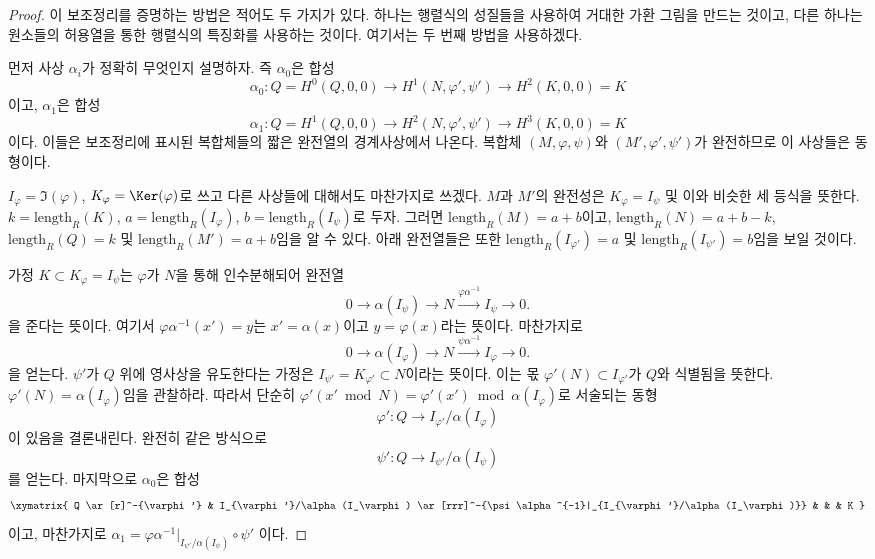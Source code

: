 \begin{proof}
이 보조정리를 증명하는 방법은 적어도 두 가지가 있다. 하나는 행렬식의
성질들을 사용하여 거대한 가환 그림을 만드는 것이고, 다른 하나는
원소들의 허용열을 통한 행렬식의 특징화를 사용하는 것이다. 여기서는
두 번째 방법을 사용하겠다.

\medskip\noindent
먼저 사상 $\alpha_i$가 정확히 무엇인지 설명하자. 즉 $\alpha_0$은
합성
$$
\alpha_0 : Q = H^0(Q, 0, 0) \to H^1(N, \varphi', \psi') \to H^2(K, 0, 0) = K
$$
이고, $\alpha_1$은 합성
$$
\alpha_1 : Q = H^1(Q, 0, 0) \to H^2(N, \varphi', \psi') \to H^3(K, 0, 0) = K
$$
이다. 이들은 보조정리에 표시된 복합체들의 짧은 완전열의 경계사상에서
나온다. 복합체 $(M, \varphi, \psi)$와 $(M', \varphi', \psi')$가
완전하므로 이 사상들은 동형이다.

\medskip\noindent
$I_\varphi = \Im(\varphi)$, $K_\varphi = \Ker(\varphi)$로 쓰고 다른
사상들에 대해서도 마찬가지로 쓰겠다. $M$과 $M'$의 완전성은
$K_\varphi = I_\psi$ 및 이와 비슷한 세 등식을 뜻한다.
$k = \text{length}_R(K)$, $a = \text{length}_R(I_\varphi)$,
$b = \text{length}_R(I_\psi)$로 두자. 그러면
$\text{length}_R(M) = a + b$이고,
$\text{length}_R(N) = a + b - k$, $\text{length}_R(Q) = k$ 및
$\text{length}_R(M') = a + b$임을 알 수 있다. 아래 완전열들은 또한
$\text{length}_R(I_{\varphi'}) = a$ 및
$\text{length}_R(I_{\psi'}) = b$임을 보일 것이다.

\medskip\noindent
가정 $K \subset K_\varphi = I_\psi$는 $\varphi$가 $N$을 통해
인수분해되어 완전열
$$
0 \to \alpha(I_\psi) \to N \xrightarrow{\varphi\alpha^{-1}} I_\psi \to 0.
$$
을 준다는 뜻이다. 여기서 $\varphi\alpha^{-1}(x') = y$는
$x' = \alpha(x)$이고 $y = \varphi(x)$라는 뜻이다. 마찬가지로
$$
0 \to \alpha(I_\varphi) \to N \xrightarrow{\psi\alpha^{-1}} I_\varphi \to 0.
$$
을 얻는다. $\psi'$가 $Q$ 위에 영사상을 유도한다는 가정은
$I_{\psi'} = K_{\varphi'} \subset N$이라는 뜻이다. 이는 몫
$\varphi'(N) \subset I_{\varphi'}$가 $Q$와 식별됨을 뜻한다.
$\varphi'(N) = \alpha(I_\varphi)$임을 관찰하라. 따라서 단순히
$\varphi'(x' \bmod N) = \varphi'(x') \bmod \alpha(I_\varphi)$로
서술되는 동형
$$
\varphi' : Q \to I_{\varphi'}/\alpha(I_\varphi)
$$
이 있음을 결론내린다. 완전히 같은 방식으로
$$
\psi' : Q \to I_{\psi'}/\alpha(I_\psi)
$$
를 얻는다. 마지막으로 $\alpha_0$은 합성
$$
\xymatrix{
Q \ar[r]^-{\varphi'} &
I_{\varphi'}/\alpha(I_\varphi)
\ar[rrr]^-{\psi\alpha^{-1}|_{I_{\varphi'}/\alpha(I_\varphi)}} & & &
K
}
$$
이고, 마찬가지로
$\alpha_1 = \varphi\alpha^{-1}|_{I_{\psi'}/\alpha(I_\psi)} \circ \psi'$
이다.


\end{proof}

